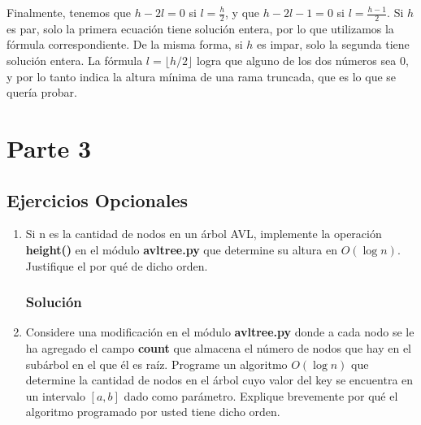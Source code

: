 \documentclass{article}
\begin{document}
Finalmente, tenemos que $h-2l=0$ si $l=\frac{h}{2}$, y que $h-2l-1=0$ si $l=\frac{h-1}{2}$. Si $h$ es par, solo la primera ecuación tiene solución entera, por lo que utilizamos la fórmula correspondiente. De la misma forma, si $h$ es impar, solo la segunda tiene solución entera. La fórmula $l = \lfloor h/2 \rfloor$ logra que alguno de los dos números sea 0, y por lo tanto indica la altura mínima de una rama truncada, que es lo que se quería probar.


\pagebreak
\section*{Parte 3}
\subsection*{Ejercicios Opcionales}
\begin{enumerate}
    \item Si n es la cantidad de nodos en un árbol AVL, implemente la operación \textbf{height()} en el módulo \textbf{avltree.py} que determine su altura en $O(\log n)$. Justifique el por qué de dicho orden.
    \subsubsection*{Solución}
    
    \item Considere una modificación en el módulo \textbf{avltree.py} donde a cada nodo se le ha agregado el campo \textbf{count} que almacena el número de nodos que hay en el subárbol en el que él es raíz. Programe un algoritmo $O(\log n)$ que determine la cantidad de nodos en el árbol cuyo valor del key se encuentra en un intervalo $[a, b]$ dado como parámetro. Explique brevemente por qué el algoritmo programado por usted tiene dicho orden.
\end{enumerate}
\end{document}
